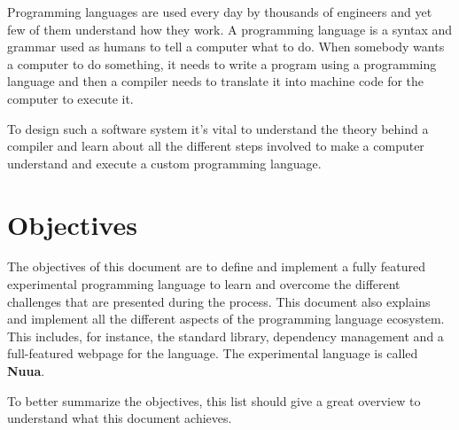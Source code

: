 Programming languages are used every day by thousands of engineers and yet few of them understand how they work.
A programming language is a syntax and grammar used as humans to tell a computer what to do. When
somebody wants a computer to do something, it needs to write a program using a programming language and then
a compiler needs to translate it into machine code for the computer to execute it.

To design such a software system it's vital to understand the theory behind a compiler and learn about all the different
steps involved to make a computer understand and execute a custom programming language.

\section{Objectives}

The objectives of this document are to define and implement a fully featured experimental programming language to learn and
overcome the different challenges that are presented during the process. This document also explains and implement
all the different aspects of the programming language ecosystem. This includes, for instance, the standard library,
dependency management and a full-featured webpage for the language. The experimental language is called \textbf{Nuua}.

To better summarize the objectives, this list should give a great overview to understand what this document achieves.

